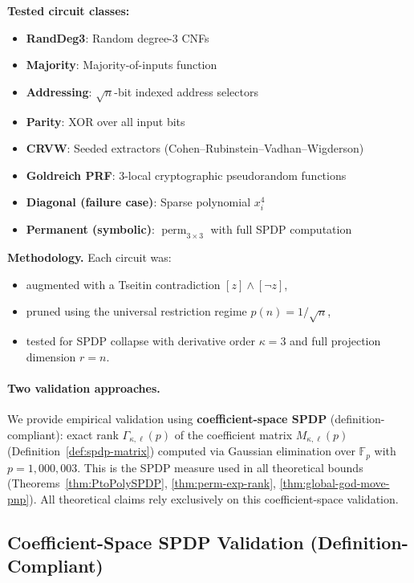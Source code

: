 \documentclass[12pt]{article}
\DeclareMathOperator{\perm}{perm}
\theoremstyle{definition}
\theoremstyle{definition}
\theoremstyle{remark}
\theoremstyle{remark}
\begin{document}
\textbf{Tested circuit classes:}
\begin{itemize}
\item \textbf{RandDeg3}: Random degree-3 CNFs
\item \textbf{Majority}: Majority-of-inputs function
\item \textbf{Addressing}: $\sqrt{n}$-bit indexed address selectors
\item \textbf{Parity}: XOR over all input bits
\item \textbf{CRVW}: Seeded extractors (Cohen--Rubinstein--Vadhan--Wigderson)
\item \textbf{Goldreich PRF}: 3-local cryptographic pseudorandom functions
\item \textbf{Diagonal (failure case)}: Sparse polynomial $x_i^4$
\item \textbf{Permanent (symbolic)}: $\perm_{3 \times 3}$ with full SPDP computation
\end{itemize}

\textbf{Methodology.} Each circuit was:
\begin{itemize}
\item augmented with a Tseitin contradiction $[z] \land [\neg z]$,
\item pruned using the universal restriction regime $p(n) = 1/\sqrt{n}$,
\item tested for SPDP collapse with derivative order $\kappa = 3$ and full projection dimension $r = n$.
\end{itemize}

\paragraph{Two validation approaches.}
We provide empirical validation using \textbf{coefficient-space SPDP} (definition-compliant): exact rank $\Gamma_{\kappa,\ell}(p)$ of the coefficient matrix $M_{\kappa,\ell}(p)$ (Definition~\ref{def:spdp-matrix}) computed via Gaussian elimination over $\mathbb{F}_p$ with $p=1{,}000{,}003$. This is the SPDP measure used in all theoretical bounds (Theorems~\ref{thm:PtoPolySPDP}, \ref{thm:perm-exp-rank}, \ref{thm:global-god-move-pnp}). All theoretical claims rely exclusively on this coefficient-space validation.

\subsection{Coefficient-Space SPDP Validation (Definition-Compliant)}
\label{subsec:coeff-space-validation}
\end{document}
